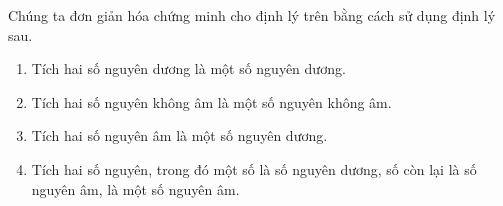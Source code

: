 \noindent Chúng ta đơn giản hóa chứng minh cho định lý trên bằng cách sử dụng định lý sau.

\begin{theorem}\label{theorem:sign-of-product-of-integers}
    \begin{enumerate}[label={(\roman*)}]
        \item Tích hai số nguyên dương là một số nguyên dương.
        \item Tích hai số nguyên không âm là một số nguyên không âm.
        \item Tích hai số nguyên âm là một số nguyên dương.
        \item Tích hai số nguyên, trong đó một số là số nguyên dương, số còn lại là số nguyên âm, là một số nguyên âm.
    \end{enumerate}
\end{theorem}


